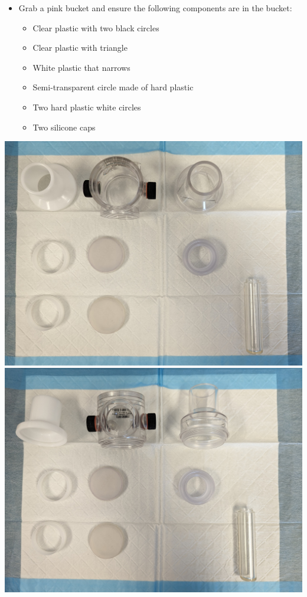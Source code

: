 \documentclass[
]{book}
\providecommand{\tightlist}{%
  \setlength{\itemsep}{0pt}\setlength{\parskip}{0pt}}
\begin{document}
\begin{itemize}
\tightlist
\item
  Grab a pink bucket and ensure the following components are in the bucket:

  \begin{itemize}
  \tightlist
  \item
    Clear plastic with two black circles
  \item
    Clear plastic with triangle
  \item
    White plastic that narrows
  \item
    Semi-transparent circle made of hard plastic
  \item
    Two hard plastic white circles
  \item
    Two silicone caps
  \end{itemize}
\end{itemize}

\includegraphics[width=0.5\linewidth]{images/maskassembly/01_all_mask_parts}
\includegraphics[width=0.5\linewidth]{images/maskassembly/01_all_mask_parts_view2}
\end{document}
